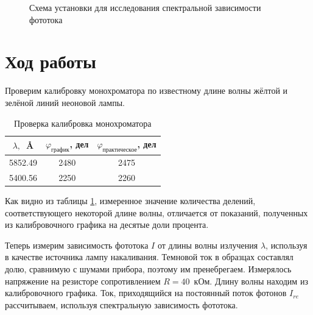 \documentclass[a4paper, 12pt]{article}
\begin{document}
	\begin{figure}[ht!]
	\caption{Схема установки для исследования спектральной зависимости фототока}
	\label{pic:scheme}
	\end{figure}
	\section{Ход работы}
Проверим калибровку монохроматора по известному длине волны жёлтой и зелёной линий неоновой лампы.

\begin{table}[h]
\centering
\begin{tabular}{|c|c|c|}
\hline
$\lambda,$~\AA       & $\varphi_{\text{график}}$, дел & $\varphi_{\text{практическое}}$, дел \\ \hline
5852.49 & 2480 & 2475 \\ \hline
5400.56 & 2250 & 2260 \\ \hline
\end{tabular}
\caption{Проверка калибровка монохроматора}
\label{calibr}
\end{table}

Как видно из таблицы \ref{calibr}, измеренное значение количества делений, соответствующего некоторой длине волны, отличается от показаний, полученных из калибровочного графика на десятые доли процента.

Теперь измерим зависимость фототока $I$ от длины волны излучения $\lambda$, используя в качестве источника лампу накаливания. Темновой ток в образцах составлял долю, сравнимую с шумами прибора, поэтому им пренебрегаем. Измерялось напряжение на резисторе сопротивлением $R = 40$~кОм. Длину волны находим из калибровочного графика. Ток, приходящийся на постоянный поток фотонов $I_{re}$ рассчитываем, используя спектральную зависимость фототока.
\end{document}
